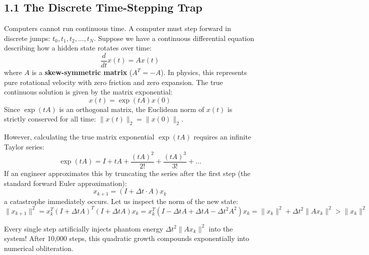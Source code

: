 \documentclass[11pt,twoside,openright]{amsbook}
\begin{document}
{{{{{{\subsection{1.1 The Discrete Time-Stepping Trap}
Computers cannot run continuous time. A computer must step forward in discrete jumps: $t_0, t_1, t_2, \dots, t_N$.
Suppose we have a continuous differential equation describing how a hidden state rotates over time:
$$\frac{d}{dt} x(t) = A x(t)$$
where $A$ is a \textbf{skew-symmetric matrix} ($A^T = -A$). In physics, this represents pure rotational velocity with zero friction and zero expansion. The true continuous solution is given by the matrix exponential:
$$x(t) = \exp(t A) x(0)$$
Since $\exp(t A)$ is an orthogonal matrix, the Euclidean norm of $x(t)$ is strictly conserved for all time: $\|x(t)\|_2 = \|x(0)\|_2$.

However, calculating the true matrix exponential $\exp(t A)$ requires an infinite Taylor series:
$$\exp(t A) = I + t A + \frac{(t A)^2}{2!} + \frac{(t A)^3}{3!} + \dots$$
If an engineer approximates this by truncating the series after the first step (the standard forward Euler approximation):
$$x_{k+1} = (I + \Delta t \cdot A) x_k$$
a catastrophe immediately occurs. Let us inspect the norm of the new state:
$$\|x_{k+1}\|^2 = x_k^T (I + \Delta t A)^T (I + \Delta t A) x_k = x_k^T (I - \Delta t A + \Delta t A - \Delta t^2 A^2) x_k = \|x_k\|^2 + \Delta t^2 \|A x_k\|^2 > \|x_k\|^2$$

Every single step artificially injects phantom energy $\Delta t^2 \|A x_k\|^2$ into the system! After 10,000 steps, this quadratic growth compounds exponentially into numerical obliteration.

}}}}}}
\end{document}

